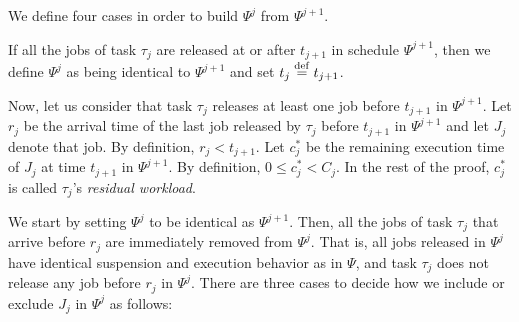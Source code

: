 
We define four cases in order to build $\Psi^j$ from $\Psi^{j+1}$.

 If all the jobs of task $\tau_j$ are released at or after $t_{j+1}$ in schedule $\Psi^{j+1}$, then we define $\Psi^j$ as being identical to $\Psi^{j+1}$ and set $t_j \stackrel{\mathrm{def}}{=} t_{j+1}$. 


Now, let us consider that  task $\tau_j$ releases at least one job before $t_{j+1}$ in $\Psi^{j+1}$. Let $r_j$ be the arrival time of the last job released by $\tau_j$ before $t_{j+1}$ in $\Psi^{j+1}$ and let $J_{j}$ denote that job. By definition, $r_j < t_{j+1}$. Let $c_j^*$ be the remaining execution time of $J_j$ at time $t_{j+1}$ in $\Psi^{j+1}$. By definition, $0 \leq c_j^* < C_j$. In the rest of the proof, $c_j^*$ is called $\tau_j$'s \emph{residual workload}.

We start by setting $\Psi^j$ to be identical as $\Psi^{j+1}$. Then, all the jobs of task $\tau_j$ that arrive before $r_j$ are immediately removed from $\Psi^j$. That is, all jobs released in $\Psi^j$ have identical suspension and execution behavior as in $\Psi$, and task $\tau_j$ does not release any job before $r_j$ in $\Psi^j$. 
There are three cases to decide how we include or exclude $J_j$ in $\Psi^j$ as follows:


